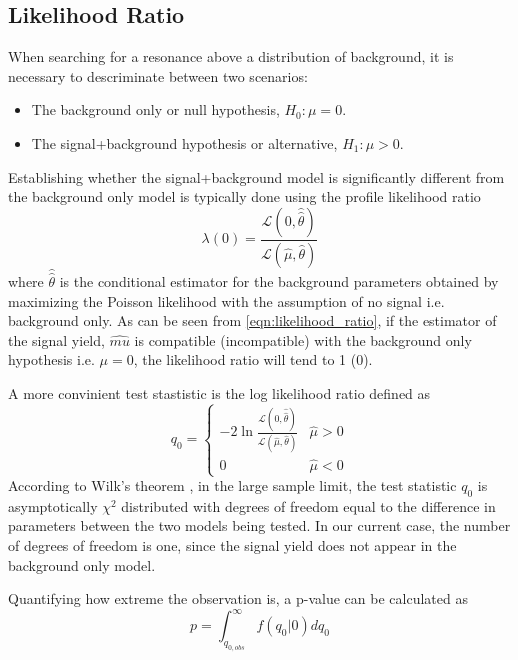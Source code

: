 \subsection{Likelihood Ratio}

When searching for a resonance above a distribution of background, it is 
necessary to descriminate between two scenarios:
\begin{itemize}
    \item The background only or null hypothesis, $H_{0}: \mu = 0$.
    \item The signal+background hypothesis or alternative, $H_{1}: \mu > 0$.
\end{itemize}
Establishing whether the signal+background model is significantly different 
from the background only model is typically done using the profile likelihood
ratio
\begin{equation}
    \lambda(0) = \frac{\mathcal{L}(0, \hat{\hat{\theta}})}{\mathcal{L}(\hat{\mu}, \hat{\theta})}
    \label{eqn:likelihood_ratio}
\end{equation}
where $\hat{\hat{\theta}}$ is the conditional estimator for the background 
parameters obtained by maximizing the Poisson likelihood with the assumption
of no signal i.e. background only.  As can be seen from \ref{eqn:likelihood_ratio}, 
if the estimator of the signal yield, $\hat{mu}$ is compatible (incompatible) with the background
only hypothesis i.e. $\mu = 0$, the likelihood ratio will tend to 1 (0).

A more convinient test stastistic is the log likelihood ratio defined as
\begin{equation}
    q_0 = \begin{cases}
            -2 \ln \frac{\mathcal{L}(0, \hat{\hat{\theta}})}{\mathcal{L}(\hat{\mu}, \hat{\theta})} 
            & \hat{\mu} > 0 \\
             0  & \hat{\mu} < 0
        \end{cases}
\end{equation}
According to Wilk's theorem \cite{Wilks:1938dza}, in the large sample limit, the test statistic
$q_0$ is asymptotically $\chi^2$ distributed with degrees of freedom equal to the
difference in parameters between the two models being tested.  In our current case, 
the number of degrees of freedom is one, since the signal yield does not appear in
the background only model.

Quantifying how extreme the observation is, a p-value can be calculated as
\begin{equation}
    p = \int_{q_{0,obs}}^{\infty} f(q_{0} | 0) dq_{0}
\end{equation} 

